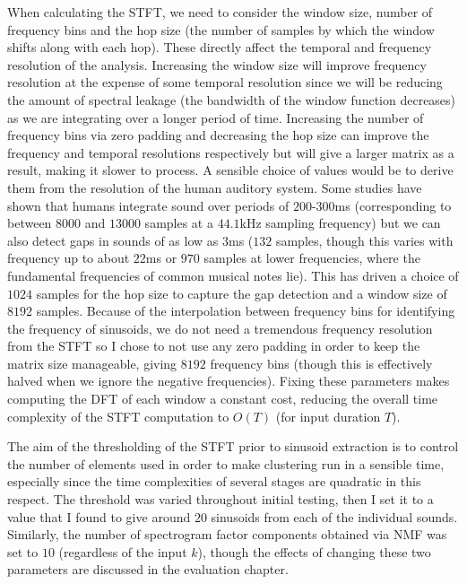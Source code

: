 \documentclass[12pt,a4paper,twoside,openright]{report}
\begin{document}
When calculating the STFT, we need to consider the window size, number of frequency bins and the hop size (the number of samples by which the window shifts along with each hop). These directly affect the temporal and frequency resolution of the analysis. Increasing the window size will improve frequency resolution at the expense of some temporal resolution since we will be reducing the amount of spectral leakage (the bandwidth of the window function decreases) as we are integrating over a longer period of time. Increasing the number of frequency bins via zero padding and decreasing the hop size can improve the frequency and temporal resolutions respectively but will give a larger matrix as a result, making it slower to process. A sensible choice of values would be to derive them from the resolution of the human auditory system. Some studies have shown that humans integrate sound over periods of $ 200 $-$ 300 $ms \cite{gelfand1998hearing} (corresponding to between $ 8000 $ and $ 13000 $ samples at a $ 44.1 $kHz sampling frequency) but we can also detect gaps in sounds of as low as $ 3 $ms \cite{shailer1983gap} ($ 132 $ samples, though this varies with frequency up to about $ 22 $ms or $ 970 $ samples at lower frequencies, where the fundamental frequencies of common musical notes lie). This has driven a choice of $ 1024 $ samples for the hop size to capture the gap detection and a window size of $ 8192 $ samples. Because of the interpolation between frequency bins for identifying the frequency of sinusoids, we do not need a tremendous frequency resolution from the STFT so I chose to not use any zero padding in order to keep the matrix size manageable, giving $ 8192 $ frequency bins (though this is effectively halved when we ignore the negative frequencies). Fixing these parameters makes computing the DFT of each window a constant cost, reducing the overall time complexity of the STFT computation to $ O(T) $ (for input duration $ T $).

The aim of the thresholding of the STFT prior to sinusoid extraction is to control the number of elements used in order to make clustering run in a sensible time, especially since the time complexities of several stages are quadratic in this respect. The threshold was varied throughout initial testing, then I set it to a value that I found to give around $ 20 $ sinusoids from each of the individual sounds. Similarly, the number of spectrogram factor components obtained via NMF was set to $ 10 $ (regardless of the input $ k $), though the effects of changing these two parameters are discussed in the evaluation chapter.
\end{document}
